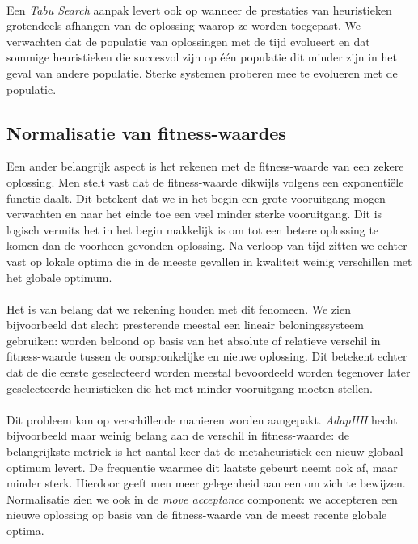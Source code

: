 \paragraph{}
Een \emph{Tabu Search} aanpak levert ook op wanneer de prestaties van heuristieken grotendeels afhangen van de oplossing waarop ze worden toegepast. We verwachten dat de populatie van oplossingen met de tijd evolueert en dat sommige heuristieken die succesvol zijn op \'e\'en populatie dit minder zijn in het geval van andere populatie. Sterke systemen proberen mee te evolueren met de populatie.

\subsection{Normalisatie van fitness-waardes}
Een ander belangrijk aspect is het rekenen met de fitness-waarde van een zekere oplossing. Men stelt vast dat de fitness-waarde dikwijls volgens een exponenti\"ele functie daalt. Dit betekent dat we in het begin een grote vooruitgang mogen verwachten en naar het einde toe een veel minder sterke vooruitgang. Dit is logisch vermits het in het begin makkelijk is om tot een betere oplossing te komen dan de voorheen gevonden oplossing. Na verloop van tijd zitten we echter vast op lokale optima die in de meeste gevallen in kwaliteit weinig verschillen met het globale optimum.

\paragraph{}
Het is van belang dat we rekening houden met dit fenomeen. We zien bijvoorbeeld dat slecht presterende \abhhn{} meestal een lineair beloningssysteem gebruiken: \abhn{} worden beloond op basis van het absolute of relatieve verschil in fitness-waarde tussen de oorspronkelijke en nieuwe oplossing. Dit betekent echter dat de \abhn{} die eerste geselecteerd worden meestal bevoordeeld worden tegenover later geselecteerde heuristieken die het met minder vooruitgang moeten stellen.

\paragraph{}
Dit probleem kan op verschillende manieren worden aangepakt. \emph{AdapHH} hecht bijvoorbeeld maar weinig belang aan de verschil in fitness-waarde: de belangrijkste metriek is het aantal keer dat de metaheuristiek een nieuw globaal optimum levert. De frequentie waarmee dit laatste gebeurt neemt ook af, maar minder sterk. Hierdoor geeft men meer gelegenheid aan een \abh{} om zich te bewijzen. Normalisatie zien we ook in de \emph{move acceptance} component: we accepteren een nieuwe oplossing op basis van de fitness-waarde van de meest recente globale optima. %

